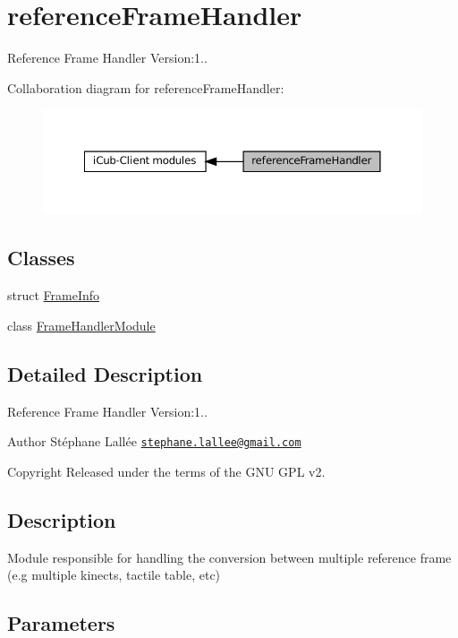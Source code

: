 \hypertarget{group__referenceFrameHandler}{}\section{reference\+Frame\+Handler}
\label{group__referenceFrameHandler}


Reference Frame Handler Version\+:1..  


Collaboration diagram for reference\+Frame\+Handler\+:
\nopagebreak
\begin{figure}[H]
\begin{center}
\leavevmode
\includegraphics[width=350pt]{group__referenceFrameHandler}
\end{center}
\end{figure}
\subsection*{Classes}
\begin{DoxyCompactItemize}
\item 
struct \hyperlink{group__referenceFrameHandler_structFrameInfo}{Frame\+Info}
\item 
class \hyperlink{group__referenceFrameHandler_classFrameHandlerModule}{Frame\+Handler\+Module}
\end{DoxyCompactItemize}


\subsection{Detailed Description}
Reference Frame Handler Version\+:1.. 

\begin{DoxyAuthor}{Author}
Stéphane Lallée \href{mailto:stephane.lallee@gmail.com}{\tt stephane.\+lallee@gmail.\+com} ~\newline
 
\end{DoxyAuthor}
\begin{DoxyCopyright}{Copyright}
Released under the terms of the G\+NU G\+PL v2. 
\end{DoxyCopyright}
\hypertarget{group__touchDetector_intro_sec}{}\subsection{Description}\label{group__touchDetector_intro_sec}
Module responsible for handling the conversion between multiple reference frame (e.\+g multiple kinects, tactile table, etc) \hypertarget{group__touchDetector_parameters_sec}{}\subsection{Parameters}\label{group__touchDetector_parameters_sec}


